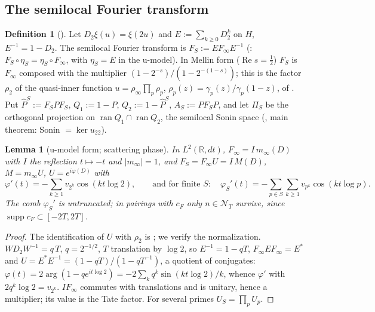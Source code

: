 \documentclass[11pt]{amsart}
\newtheorem{lemma}[theorem]{Lemma}
\theoremstyle{definition}
\newtheorem{definition}[theorem]{Definition}
\theoremstyle{remark}
\newcommand{\R}{\mathbb R}
\newcommand{\supp}{\operatorname{supp}}
\newcommand{\cF}{c_F}
\newcommand{\NT}{\mathcal N_T}
\begin{document}
\subsection{The semilocal Fourier transform}
\begin{definition}[\cite{CCM2023,CCquasi2020}]\label{def:FS}
Let $D_2\xi(u)=\xi(2u)$ and $E:=\sum_{k\ge0}D_2^k$ on $H$, $E^{-1}=1-D_2$. The semilocal Fourier transform is
$F_S:=EF_\infty E^{-1}$ (\cite[Prop.~4.1]{CCM2023}: $F_S\circ\eta_S=\eta_S\circ F_\infty$, with $\eta_S=E$ in the
u-model). In Mellin form ($\operatorname{Re}s=\frac12$) $F_S$ is $F_\infty$ composed with the multiplier
$(1-2^{-s})/(1-2^{-(1-s)})$; this is the factor $\rho_2$ of the quasi-inner function
$u=\rho_\infty\prod_p\rho_p$, $\rho_p(z)=\gamma_p(z)/\gamma_p(1-z)$, of \cite[Lemma~3.1]{CCquasi2020}.
Put $\widehat P^S:=F_SPF_S$, $Q_1:=1-P$, $Q_2:=1-\widehat P^S$, $A_S:=PF_SP$, and let $\Pi_S$ be the
orthogonal projection on $\operatorname{ran}Q_1\cap\operatorname{ran}Q_2$, the semilocal Sonin space
(\cite{CCquasi2020}, main theorem: Sonin $=\ker u_{22}$).
\end{definition}

\begin{lemma}[u-model form; scattering phase]\label{lem:sl-phase}
In $L^2(\R,dt)$, $F_\infty=I\,m_\infty(D)$ with $I$ the reflection $t\mapsto-t$ and $|m_\infty|=1$, and
$F_S=F_\infty U=I\,M(D)$, $M=m_\infty U$, $U=e^{i\varphi(D)}$ with
\[
\varphi'(t)=-\sum_{k\ge1}v_{2^k}\cos(kt\log2),\qquad\text{and for finite }S:\quad
\varphi_S'(t)=-\sum_{p\in S}\sum_{k\ge1}v_{p^k}\cos(kt\log p).
\]
The comb $\varphi_S'$ is untruncated; in pairings with $\cF$ only $n\in\NT$ survive, since $\supp\cF\subset[-2T,2T]$.
\end{lemma}
\begin{proof}
The identification of $U$ with $\rho_2$ is \cite[Lemma~3.1]{CCquasi2020}; we verify the normalization.
$WD_2W^{-1}=q\,T$, $q=2^{-1/2}$, $T$ translation by $\log2$, so $E^{-1}=1-qT$, $F_\infty EF_\infty=E^*$ and
$U=E^*E^{-1}=(1-qT)/(1-qT^{-1})$, a quotient of conjugates: $\varphi(t)=2\arg(1-qe^{it\log2})=-2\sum_kq^k\sin(kt\log2)/k$,
whence $\varphi'$ with $2q^k\log2=v_{2^k}$. $IF_\infty$ commutes with translations and is unitary, hence a
multiplier; its value is the Tate factor. For several primes $U_S=\prod_pU_p$.
\end{proof}
\end{document}
